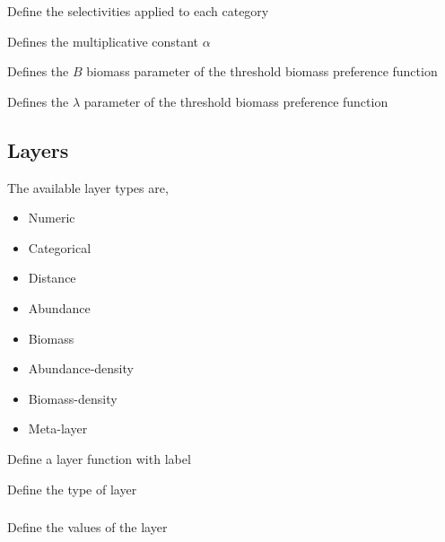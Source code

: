  {Define the selectivities applied to each category}


 {Defines the multiplicative constant $\alpha$}

 {Defines the $B$ biomass parameter of the threshold biomass preference function}

 {Defines the $\lambda$ parameter of the threshold biomass preference function}

\subsection{Layers}

The available layer types  are, 

\begin{itemize}
	\item Numeric
	\item Categorical
	\item Distance
	\item Abundance
	\item Biomass
	\item Abundance-density
	\item Biomass-density
	\item Meta-layer
\end{itemize}

 {Define a layer function with label}

 {Define the type of layer}

\subsubsection[Numeric]{}

 {Define the values of the layer}

